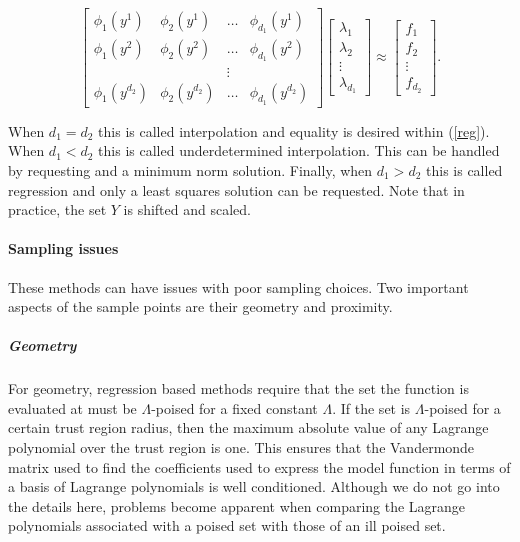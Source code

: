 \documentclass{article}
\let\oldref\ref
\renewcommand{\ref}[1]{(\oldref{#1})}
\begin{document}
\begin{equation}
\label{reg}
\begin{bmatrix}
    \phi_1(y^1)      & \phi_2(y^1)       & \ldots & \phi_{d_1}(y^1)      \\
    \phi_1(y^2)      & \phi_2(y^2)       & \dots  & \phi_{d_1}(y^2)      \\
                     &                   & \vdots &                      \\
    \phi_1(y^{d_2})  & \phi_2(y^{d_2})   & \ldots & \phi_{d_1}(y^{d_2})
\end{bmatrix}
\begin{bmatrix}
    \lambda_1      \\
    \lambda_2      \\
    \vdots         \\            
    \lambda_{d_1}
\end{bmatrix}
\approx
\begin{bmatrix}
    f_1      \\
    f_2      \\
    \vdots         \\            
    f_{d_2}
\end{bmatrix}.
\end{equation}

When $d_1 = d_2$ this is called interpolation and equality is desired within \ref{reg}.
When $d_1 < d_2$ this is called underdetermined interpolation.
This can be handled by requesting and a minimum norm solution.
Finally, when $d_1 > d_2$ this is called regression and only a least squares solution can be requested.
Note that in practice, the set $Y$ is shifted and scaled.

\paragraph{Sampling issues}

These methods can have issues with poor sampling choices.
Two important aspects of the sample points are their geometry and proximity.

\subparagraph{Geometry}

For geometry, regression based methods require that the set the function is evaluated at must be $\Lambda$-poised for a fixed constant $\Lambda$.
If the set is $\Lambda$-poised for a certain trust region radius, then the maximum absolute value of any Lagrange polynomial over the trust region is one.
This ensures that the Vandermonde matrix used to find the coefficients used to express the model function in terms of a basis of Lagrange polynomials is well conditioned.
Although we do not go into the details here, problems become apparent when comparing the Lagrange polynomials associated with a poised set with those of an ill poised set.
\end{document}

